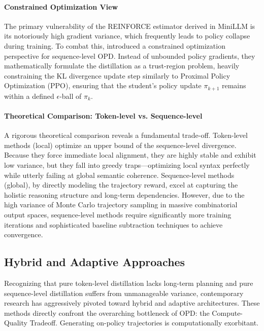 \documentclass{article} %
\begin{document}
\paragraph{Constrained Optimization View}
The primary vulnerability of the REINFORCE estimator derived in MiniLLM is its notoriously high gradient variance, which frequently leads to policy collapse during training. To combat this, \citet{2509.22921} introduced a constrained optimization perspective for sequence-level OPD. Instead of unbounded policy gradients, they mathematically formulate the distillation as a trust-region problem, heavily constraining the KL divergence update step similarly to Proximal Policy Optimization (PPO), ensuring that the student's policy update $\pi_{k+1}$ remains within a defined $\epsilon$-ball of $\pi_k$.

\paragraph{Theoretical Comparison: Token-level vs. Sequence-level}
A rigorous theoretical comparison reveals a fundamental trade-off. Token-level methods (local) optimize an upper bound of the sequence-level divergence. Because they force immediate local alignment, they are highly stable and exhibit low variance, but they fall into greedy traps—optimizing local syntax perfectly while utterly failing at global semantic coherence. Sequence-level methods (global), by directly modeling the trajectory reward, excel at capturing the holistic reasoning structure and long-term dependencies. However, due to the high variance of Monte Carlo trajectory sampling in massive combinatorial output spaces, sequence-level methods require significantly more training iterations and sophisticated baseline subtraction techniques to achieve convergence.

\subsection{Hybrid and Adaptive Approaches}
\label{subsec:hybrid}

Recognizing that pure token-level distillation lacks long-term planning and pure sequence-level distillation suffers from unmanageable variance, contemporary research has aggressively pivoted toward hybrid and adaptive architectures. These methods directly confront the overarching bottleneck of OPD: the Compute-Quality Tradeoff. Generating on-policy trajectories is computationally exorbitant.
\end{document}
